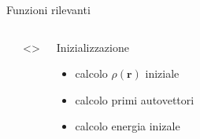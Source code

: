 \documentclass[8pt]{beamer}
\newcommand\dens{\rho(\mathbf{r})}
\begin{document}
\begin{frame}{Funzioni rilevanti}
{\begin{minipage}[t][0.5\textheight][t]{\textwidth}
\begin{columns}
\begin{flushleft}
				\end{flushleft}    	

				
				
				\only<>{
					\begin{block}{Inizializzazione} 
						\begin{itemize}
							\item calcolo $\dens$ iniziale
							\item calcolo primi autovettori
							\item calcolo energia inizale
					\end{itemize}
					\end{block}
				}
				

\end{columns}
\end{minipage}}
\end{frame}
\end{document}
